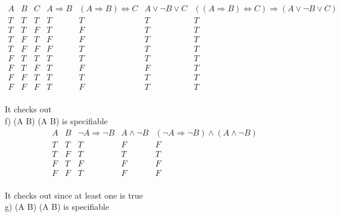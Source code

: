 \documentclass{article}
\begin{document}
\begin{displaymath}
\begin{array}{|c|c|c|c|c|c|c|c}

A & 
B & 
C &
A \Rightarrow B & 
(A \Rightarrow B) \Leftrightarrow C &
A \vee \neg B \vee C &
((A \Rightarrow B) \Leftrightarrow C) \Rightarrow (A \vee \neg B \vee C)\\ %
\hline  %
T & T & T & T & T & T & T\\
T & T & F & T & F & T & T\\
T & F & T & F & F & T & T\\
T & F & F & F & T & T & T\\
F & T & T & T & T & T & T\\
F & T & F & T & F & F & T\\
F & F & T & T & T & T & T\\
F & F & F & T & F & T & T\\

\end{array}
\end{displaymath}

It checks out\\

f) \: (\neg A \Rightarrow \neg B) \wedge (A \wedge \neg B) is specifiable\\


\begin{displaymath}
\begin{array}{|c|c|c|c|c|c}

A & 
B & 
\neg A \Rightarrow \neg B & 
A \wedge \neg B &
(\neg A \Rightarrow \neg B) \wedge (A \wedge \neg B)\\ %
\hline  %
T & T & T & F & F\\
T & F & T & T & T\\
F & T & F & F & F\\
F & F & T & F & F\\

\end{array}
\end{displaymath}


It checks out since at least one is true\\


g) \: (\neg A \Leftrightarrow \neg B) \wedge (A \wedge \neg B) is specifiable\\
\end{document}
